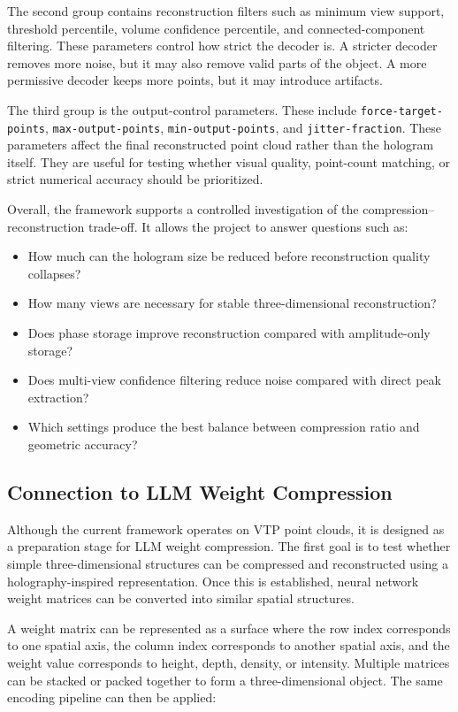 \documentclass{article}
\begin{document}
\begin{normalsize}
The second group contains reconstruction filters such as minimum view support, threshold percentile, volume confidence percentile, and connected-component filtering. These parameters control how strict the decoder is. A stricter decoder removes more noise, but it may also remove valid parts of the object. A more permissive decoder keeps more points, but it may introduce artifacts.

The third group is the output-control parameters. These include \texttt{force-target-points}, \texttt{max-output-points}, \texttt{min-output-points}, and \texttt{jitter-fraction}. These parameters affect the final reconstructed point cloud rather than the hologram itself. They are useful for testing whether visual quality, point-count matching, or strict numerical accuracy should be prioritized.

Overall, the framework supports a controlled investigation of the compression--reconstruction trade-off. It allows the project to answer questions such as:

\begin{itemize}
    \item How much can the hologram size be reduced before reconstruction quality collapses?
    \item How many views are necessary for stable three-dimensional reconstruction?
    \item Does phase storage improve reconstruction compared with amplitude-only storage?
    \item Does multi-view confidence filtering reduce noise compared with direct peak extraction?
    \item Which settings produce the best balance between compression ratio and geometric accuracy?
\end{itemize}

\subsection{Connection to LLM Weight Compression}

Although the current framework operates on VTP point clouds, it is designed as a preparation stage for LLM weight compression. The first goal is to test whether simple three-dimensional structures can be compressed and reconstructed using a holography-inspired representation. Once this is established, neural network weight matrices can be converted into similar spatial structures.

A weight matrix can be represented as a surface where the row index corresponds to one spatial axis, the column index corresponds to another spatial axis, and the weight value corresponds to height, depth, density, or intensity. Multiple matrices can be stacked or packed together to form a three-dimensional object. The same encoding pipeline can then be applied:


\end{normalsize}
\end{document}
